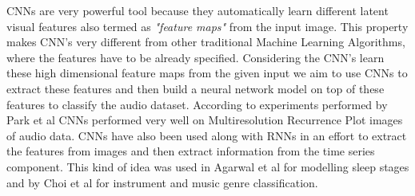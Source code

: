 \documentclass[letterpaper, 12 pt, conference]{ieeeconf}  %
\begin{document}
CNNs are very powerful tool because they automatically learn different latent visual features also termed as \textit{"feature maps"} from the input image. This property makes CNN's very different from other traditional Machine Learning Algorithms, where the features have to be already specified. Considering the CNN's learn these high dimensional feature maps from the given input we aim to use CNNs to extract these features and then build a neural network model on top of these features to classify the audio dataset. According to experiments performed by Park et al \cite{cnn_music_mrp} CNNs performed very well on Multiresolution Recurrence Plot images of audio data. CNNs have also been used along with RNNs in an effort to extract the features from images and then extract information from the time series component. This kind of idea was used in Agarwal et al \cite{cnn_rnn_sleep_staging} for modelling sleep stages and by Choi et al \cite{crnn} for instrument and music genre classification.

\end{document}
